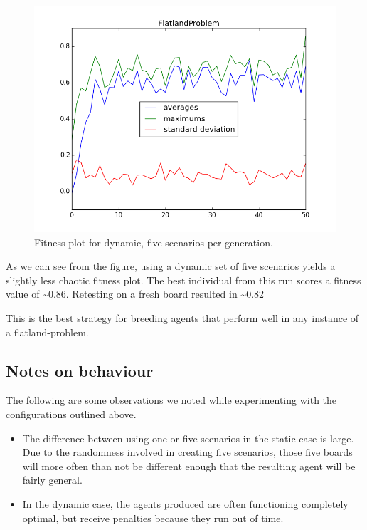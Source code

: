 \documentclass[twoside]{article}
\begin{document}
\begin{multicols}{2}
  \begin{figure}[H]
    \centering
    \includegraphics[width=\linewidth]{images/dynamic_5.png}
    \caption{Fitness plot for dynamic, five scenarios per generation.} \label{fig:static-single}
  \end{figure}

  As we can see from the figure, using a dynamic set of five scenarios yields a slightly less chaotic fitness plot.
  The best individual from this run scores a fitness value of \textasciitilde $0.86$.
  Retesting on a fresh board resulted in \textasciitilde $0.82$

  This is the best strategy for breeding agents that perform well in any instance of a flatland-problem.

  \subsection{Notes on behaviour}

  The following are some observations we noted while experimenting with the configurations outlined above.

  \begin{itemize}
    \item The difference between using one or five scenarios in the static case is large.
          Due to the randomness involved in creating five scenarios,
          those five boards will more often than not be different enough
          that the resulting agent will be fairly general.
    \item In the dynamic case, the agents produced are often functioning completely optimal,
          but receive penalties because they run out of time.
  \end{itemize}

\end{multicols}

%
%
\end{document}
